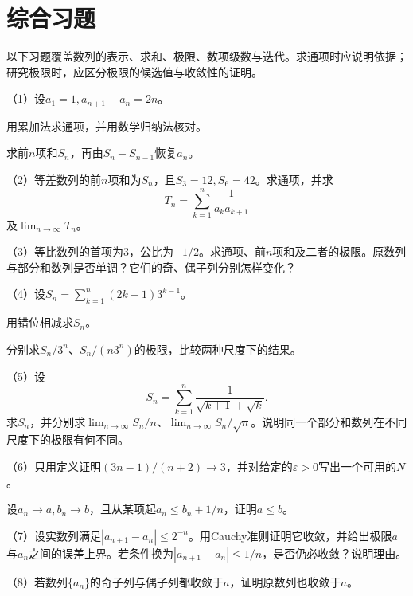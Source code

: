 \newpage
\section{综合习题}
\label{sec:analysis-comprehensive-exercises}

以下习题覆盖数列的表示、求和、极限、数项级数与迭代。求通项时应说明依据；研究极限时，应区分极限的候选值与收敛性的证明。

\begin{exercise}
\label{exs:analysis-comprehensive}
\mbox{}\par\nobreak

（1）设\(a_1=1,a_{n+1}-a_n=2n\)。

\quad {}用累加法求通项，并用数学归纳法核对。

\quad {}求前\(n\)项和\(S_n\)，再由\(S_n-S_{n-1}\)恢复\(a_n\)。

（2）等差数列的前\(n\)项和为\(S_n\)，且\(S_3=12,S_6=42\)。求通项，并求
\begin{equation*}
 T_n=\sum_{k=1}^n\frac1{a_ka_{k+1}}
\end{equation*}
及\(\lim_{n\to\infty}T_n\)。

（3）等比数列的首项为\(3\)，公比为\(-1/2\)。求通项、前\(n\)项和及二者的极限。原数列与部分和数列是否单调？它们的奇、偶子列分别怎样变化？

（4）设\(S_n=\sum_{k=1}^n(2k-1)3^{k-1}\)。

\quad {}用错位相减求\(S_n\)。

\quad {}分别求\(S_n/3^n\)、\(S_n/(n3^n)\)的极限，比较两种尺度下的结果。

（5）设
\begin{equation*}
 S_n=\sum_{k=1}^n\frac1{\sqrt{k+1}+\sqrt k}.
\end{equation*}
求\(S_n\)，并分别求\(\lim_{n\to\infty}S_n/n\)、\(\lim_{n\to\infty}S_n/\sqrt n\)。说明同一个部分和数列在不同尺度下的极限有何不同。

（6）只用定义证明\((3n-1)/(n+2)\to3\)，并对给定的\(\varepsilon>0\)写出一个可用的\(N\)。

\quad {}设\(a_n\to a,b_n\to b\)，且从某项起\(a_n\le b_n+1/n\)，证明\(a\le b\)。

（7）设实数列满足\(|a_{n+1}-a_n|\le2^{-n}\)。用Cauchy准则证明它收敛，并给出极限\(a\)与\(a_n\)之间的误差上界。若条件换为\(|a_{n+1}-a_n|\le1/n\)，是否仍必收敛？说明理由。

（8）若数列\(\{a_n\}\)的奇子列与偶子列都收敛于\(a\)，证明原数列也收敛于\(a\)。


\end{exercise}

